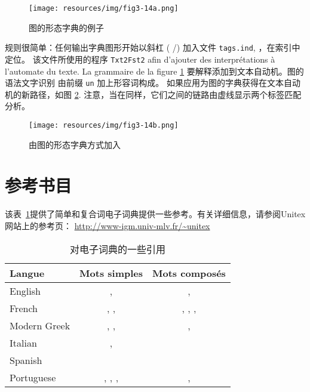 \begin{figure}[!ht]
\begin{center}
\texttt{[image: resources/img/fig3-14a.png]}
\caption{图的形态字典的例子\label{morphoA}}
\end{center}
\end{figure}

\noindent 规则很简单：任何输出字典图形开始以斜杠 ( /) 
加入文件 \verb+tags.ind+, ，在索引中定位。
该文件所使用的程序 \verb+Txt2Fst2+ afin d'ajouter des interprétations à
l'automate du texte. La grammaire de la figure \ref{morphoA} 要解释添加到文本自动机。图的语法文字识别
由前缀 \verb+un+ 加上形容词构成。 如果应用为图的字典获得在文本自动机的新路径，如图
\ref{morphoB}. 注意，当在同样，它们之间的链路由虚线显示两个标签匹配分析。

\begin{figure}[!ht]
\begin{center}
\texttt{[image: resources/img/fig3-14b.png]}
\caption{由图的形态字典方式加入\label{morphoB}}
\end{center}
\end{figure}

\section{参考书目}

该表~\ref{ref-dicos}提供了简单和复合词电子词典提供一些参考。有关详细信息，请参阅Unitex网站上的参考页： \url{http://www-igm.univ-mlv.fr/~unitex}

\bigskip
\begin{table}[!h]
\begin{center}
\begin{tabular}{|l|c|c|}
\hline
\textbf{Langue} & \textbf{Mots simples} & \textbf{Mots composés} \\
\hline
English & \cite{klarsfeld}, \cite{monceaux-1995} & \cite{delac-anglais},
\cite{these-Savary} \\
\hline
French & \cite{formes-ambigues}, \cite{dicos-francais}, \cite{jacques-1995} & \cite{dicos-francais},
\cite{Gross96},
\cite{max-1993},
\cite{syntaxe-de-ladverbe} \\
\hline
Modern Greek & \cite{modern-greek}, \cite{matthieu-anastasia}, \cite{these-tita} & \cite{tita-2002},
\cite{anastasia-2002} \\
\hline
Italian & \cite{delaf-italien}, \cite{delaf-italien-book} & \cite{composes-italien} \\
\hline
Spanish & \cite{blanco-2000} & \cite{blanco-1997} \\
\hline
Portuguese & \cite{eleuterio1995}, \cite{ranchhod1996b}, \cite{ranchhodd1998},
\cite{muniz2005} & \cite{ranchhod1991}, \cite{ranchhodd1998} \\
\hline
\end{tabular}
\caption{对电子词典的一些引用\label{ref-dicos}}
\end{center}
\end{table}

